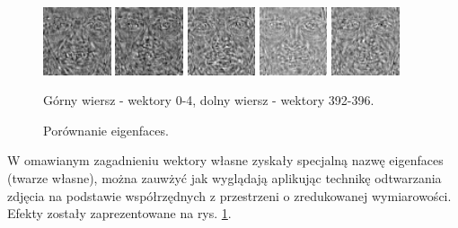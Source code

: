 \documentclass[oneside, eng]{mgr}
\begin{document}
\begin{figure}
	\begin{minipage}{2cm}
		\includegraphics[width=2cm]{392.jpg}
	\end{minipage}
	\begin{minipage}{2cm}
		\includegraphics[width=2cm]{393.jpg}
	\end{minipage}
	\begin{minipage}{2cm}
		\includegraphics[width=2cm]{394.jpg}
	\end{minipage}
	\begin{minipage}{2cm}
		\includegraphics[width=2cm]{395.jpg}
	\end{minipage}
	\begin{minipage}{2cm}
		\includegraphics[width=2cm]{396.jpg}
	\end{minipage}
	
	\caption{Porównanie eigenfaces.}
Górny wiersz - wektory 0-4, dolny wiersz - wektory 392-396.
	\label{fig:eigenfaces}
\end{figure}

W omawianym zagadnieniu wektory własne zyskały specjalną nazwę eigenfaces (twarze własne), można zauwżyć jak wyglądają aplikując technikę odtwarzania zdjęcia na podstawie współrzędnych z przestrzeni o zredukowanej wymiarowości. Efekty zostały zaprezentowane na rys. \ref{fig:eigenfaces}. 
\end{document}
